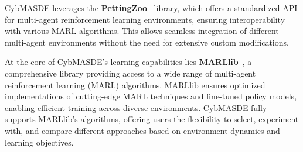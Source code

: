 \documentclass[pdflatex,sn-mathphys-num]{sn-jnl}%
\theoremstyle{thmstyleone}%
\theoremstyle{thmstyletwo}%
\theoremstyle{thmstylethree}%
\begin{document}
CybMASDE leverages the \textbf{PettingZoo}~\cite{Terry2021} library, which offers a standardized API for multi-agent reinforcement learning environments, ensuring interoperability with various MARL algorithms. This allows seamless integration of different multi-agent environments without the need for extensive custom modifications.

At the core of CybMASDE's learning capabilities lies \textbf{MARLlib}~\cite{hu2022marllib}, a comprehensive library providing access to a wide range of multi-agent reinforcement learning (MARL) algorithms. MARLlib ensures optimized implementations of cutting-edge MARL techniques and fine-tuned policy models, enabling efficient training across diverse environments. CybMASDE fully supports MARLlib's algorithms, offering users the flexibility to select, experiment with, and compare different approaches based on environment dynamics and learning objectives.
\end{document}
